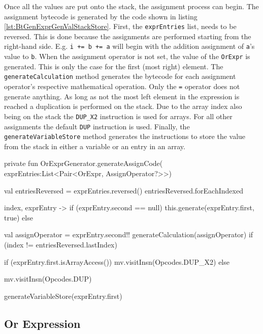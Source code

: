 Once all the values are put onto the stack, the assignment process can begin. The assignment bytecode is generated by the code shown in listing \ref{lst:BtGenExprGenValStackStore}. First, the \verb|exprEntries| list, needs to be reversed. This is done because the assignments are performed starting from the right-hand side. E.g. \verb|i += b += a| will begin with the addition assignment of \verb|a|'s value to \verb|b|. When the assignment operator is not set, the value of the \verb|OrExpr| is generated. This is only the case for the first (most right) element. The \verb|generateCalculation| method generates the bytecode for each assignment operator's respective mathematical operation. Only the \verb|=| operator does not generate anything. As long as not the most left element in the expression is reached a duplication is performed on the stack. Due to the array index also being on the stack the \verb|DUP_X2| instruction is used for arrays. For all other assignments the default \verb|DUP| instruction is used. Finally, the \verb|generateVariableStore| method generates the instructions to store the value from the stack in either a variable or an entry in an array.

\begin{KotlinCode}[float,numbers=none,caption=Implementation of the \texttt{generateAssignCode} extension function in the \texttt{ExpressionGenerator}., label=lst:BtGenExprGenValStackStore]
private fun OrExprGenerator.generateAssignCode(
    exprEntries:List<Pair<OrExpr, AssignOperator?>>) {
    val entriesReversed = exprEntries.reversed()
    entriesReversed.forEachIndexed { index, exprEntry ->
        if (exprEntry.second == null) {
            this.generate(exprEntry.first, true)
        } else {
            val assignOperator = exprEntry.second!!
            generateCalculation(assignOperator)
            if (index != entriesReversed.lastIndex) {
                if (exprEntry.first.isArrayAccess()) {
                    mv.visitInsn(Opcodes.DUP_X2)
                } else {
                    mv.visitInsn(Opcodes.DUP)

                }
            }
            generateVariableStore(exprEntry.first)
        }
    }
}
\end{KotlinCode}

\subsection{Or Expression}

